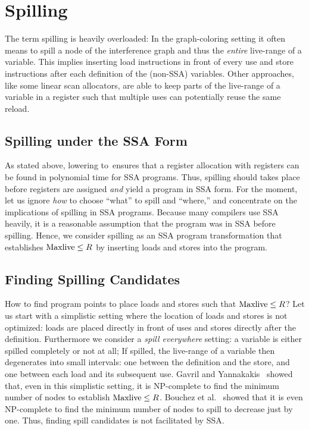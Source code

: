 {\section{Spilling}

The term spilling is heavily overloaded:
In the graph-coloring setting it often means to spill a node of the interference graph and thus the \emph{entire} live-range of a variable.
This implies inserting load instructions in front of every use and store instructions after each definition of the (non-SSA) variables.
Other approaches, like some linear scan allocators, are able to keep parts of the live-range of a variable in a register such that multiple uses can potentially reuse the same reload.

\subsection{Spilling under the SSA Form}

As stated above, lowering \maxlive to~\regs ensures that a register allocation with \regs registers can be found in polynomial time for SSA programs.
Thus, spilling should takes place before registers are assigned \emph{and} yield a program in SSA form.
For the moment, let us ignore \emph{how} to choose ``what'' to spill and ``where,'' and concentrate on the implications of spilling in SSA programs.
Because many compilers use SSA heavily, it is a reasonable assumption that the program was in SSA before spilling.
Hence, we consider spilling as an SSA program transformation that establishes $\mathrm{Maxlive}\le R$ by inserting loads and stores into the program.


\subsection{Finding Spilling Candidates}

How to find program points to place loads and stores such that $\mathrm{Maxlive}\le R$?
Let us start with a simplistic setting where the location of loads and stores is not optimized:
loads are placed directly in front of uses and stores directly after the definition.
Furthermore we consider a \emph{spill everywhere} setting:
a variable is either spilled completely or not at all;
If spilled, the live-range of a variable then degenerates into small intervals: one between the definition and the store, and one between each load and its subsequent use.
Gavril and Yannakakis~\cite{YannakakisGavril87} showed that, even in this simplistic setting, it is NP-complete to find the minimum number of nodes to establish $\mathrm{Maxlive}\le R$.
Bouchez et al.~\cite{BouchezDR07:spill} showed that it is even NP-complete to find the minimum number of nodes to spill to decrease \maxlive just by one.
Thus, finding spill candidates is not facilitated by SSA.


}
